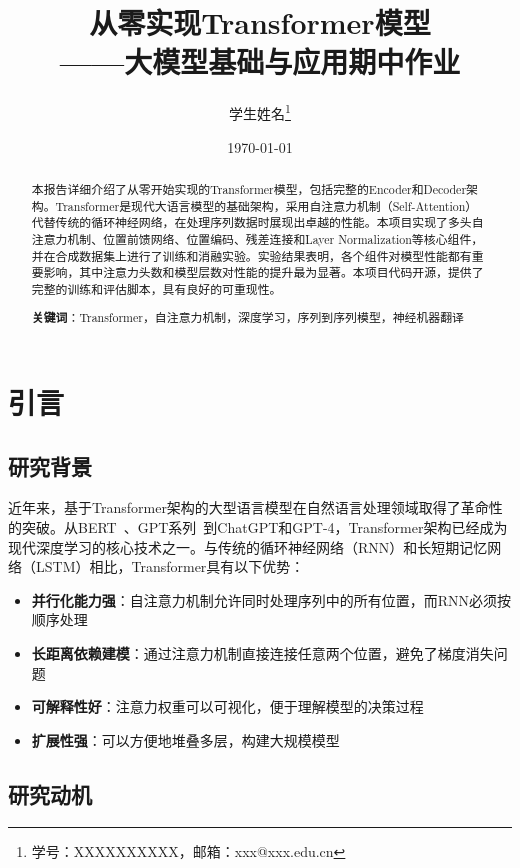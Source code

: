 \documentclass[UTF8,12pt,a4paper]{ctexart}
\title{\textbf{从零实现Transformer模型\\——大模型基础与应用期中作业}}
\author{学生姓名\thanks{学号：XXXXXXXXXX，邮箱：xxx@xxx.edu.cn}}
\date{\today}
\begin{document}
\maketitle

\begin{abstract}
本报告详细介绍了从零开始实现的Transformer模型，包括完整的Encoder和Decoder架构。Transformer是现代大语言模型的基础架构，采用自注意力机制（Self-Attention）代替传统的循环神经网络，在处理序列数据时展现出卓越的性能。本项目实现了多头自注意力机制、位置前馈网络、位置编码、残差连接和Layer Normalization等核心组件，并在合成数据集上进行了训练和消融实验。实验结果表明，各个组件对模型性能都有重要影响，其中注意力头数和模型层数对性能的提升最为显著。本项目代码开源，提供了完整的训练和评估脚本，具有良好的可重现性。

\textbf{关键词}：Transformer，自注意力机制，深度学习，序列到序列模型，神经机器翻译
\end{abstract}

\section{引言}

\subsection{研究背景}

近年来，基于Transformer架构的大型语言模型在自然语言处理领域取得了革命性的突破。从BERT~\cite{devlin2018bert}、GPT系列~\cite{radford2019language}到ChatGPT和GPT-4，Transformer架构已经成为现代深度学习的核心技术之一。与传统的循环神经网络（RNN）和长短期记忆网络（LSTM）相比，Transformer具有以下优势：

\begin{itemize}
    \item \textbf{并行化能力强}：自注意力机制允许同时处理序列中的所有位置，而RNN必须按顺序处理
    \item \textbf{长距离依赖建模}：通过注意力机制直接连接任意两个位置，避免了梯度消失问题
    \item \textbf{可解释性好}：注意力权重可以可视化，便于理解模型的决策过程
    \item \textbf{扩展性强}：可以方便地堆叠多层，构建大规模模型
\end{itemize}

\subsection{研究动机}
\end{document}
